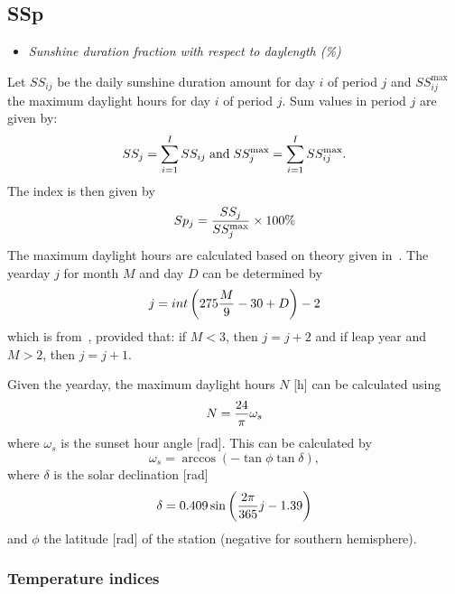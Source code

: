 \documentclass[a4paper,11pt]{article}
\begin{document}
\subsection*{SSp}
\begin{itemize}
\item \textit{Sunshine duration fraction with respect to daylength (\%)}
\end{itemize}
Let $SS_{ij}$ be the daily sunshine duration amount for day $i$ of period $j$ and $SS_{ij}^{\text{max}}$ the maximum daylight
hours for day $i$ of period $j$. Sum values in period $j$ are given by:
\begin{equation}
SS_j = \sum_{i=1}^I SS_{ij} \; \text{and} \;
SS_j^{\text{max}} = \sum_{i=1}^I SS_{ij}^{\text{max}}. \notag
\end{equation}
The index is then given by
\begin{equation}
Sp_j = {SS_j \over SS_j^{\text{max}}} \times 100\% \notag
\end{equation}
The maximum daylight hours are calculated based on theory given in~\cite{allen:94b}.
The yearday $j$ for month $M$ and day $D$ can be determined by
\begin{equation} \label{eq:c1}
j = int \left( 275 {M \over 9} - 30 + D \right) - 2
\end{equation}
which is from~\cite[eq. 1.26]{allen:94b}, provided that: if $M < 3$, then $j = j + 2$ and if leap year and $M > 2$, then
$j = j + 1$.

Given the yearday, the maximum daylight hours $N$ [h] can be calculated using~\cite[eq. 1.34]{allen:94b}
\begin{equation} \label{eq:c2}
N = {24 \over \pi} \omega_s
\end{equation}
where $\omega_s$ is the sunset hour angle [rad]. This can be calculated by~\cite[eq. 1.23]{allen:94b}
\begin{equation} \label{eq:c3}
\omega_s = \arccos \left( -\tan \phi \tan \delta \right),
\end{equation}
where $\delta$ is the solar declination [rad]~\cite[eq. 1.25]{allen:94b}
\begin{equation} \label{eq:c4}
\delta = 0.409 \sin \left( {2 \pi \over 365} j - 1.39 \right)
\end{equation}
and $\phi$ the latitude [rad] of the station (negative for southern hemisphere).

\subsubsection{Temperature indices}
\end{document}
